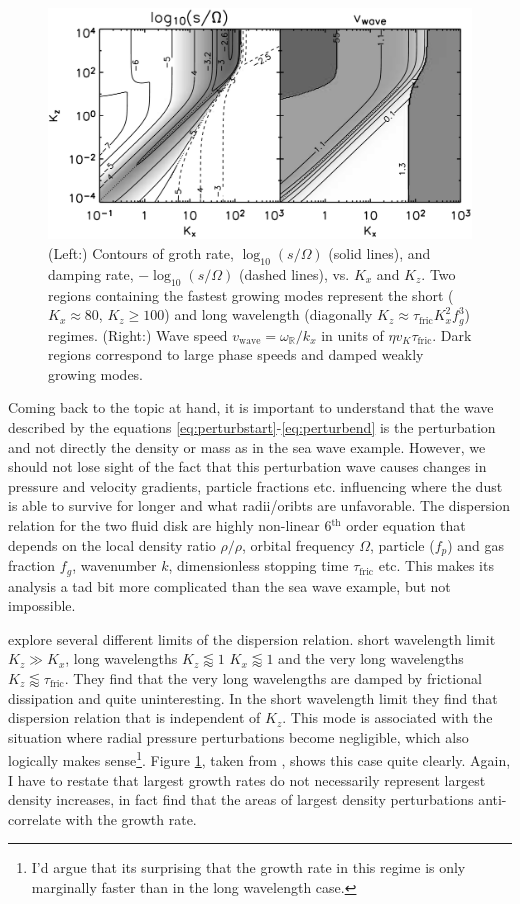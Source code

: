 \documentclass[12pt]{article}
\begin{document}
\begin{figure}[htbp]
    \label{fig:shortwave}
    \centering
    \includegraphics[width=0.7\linewidth]{images/shortwave.png}
    \caption{(Left:) Contours of groth rate, $\log_{10}(s/\Omega)$ (solid lines), and damping rate, $-\log_{10}(s/\Omega)$ (dashed lines), vs. $K_x$ and $K_z$. Two regions containing the fastest growing modes represent the short ($K_x\approx 80$, $K_z\ge100$) and long wavelength (diagonally $K_z\approx\tau_\mathrm{fric}K_x^2f_g^3$) regimes. (Right:) Wave speed $v_\mathrm{wave}=\omega_\mathbb{R}/k_x$ in units of $\eta v_K \tau_\mathrm{fric}$. Dark regions correspond to large phase speeds and damped weakly growing modes. }
\end{figure}

Coming back to the topic at hand, it is important to understand that the wave described by the equations \ref{eq:perturbstart}-\ref{eq:perturbend} is the perturbation and not directly the density or mass as in the sea wave example. However, we should not lose sight of the fact that this perturbation wave causes changes in pressure and velocity gradients, particle fractions etc. influencing where the dust is able to survive for longer and what radii/oribts are unfavorable. The dispersion relation for the two fluid disk are highly non-linear  6$^{\mathrm{th}}$ order equation that depends on the local density ratio $\rho/\rho$, orbital frequency $\Omega$, particle ($f_p$) and gas fraction $f_g$, wavenumber $k$, dimensionless stopping time $\tau_\mathrm{fric}$ etc. This makes its analysis a tad bit more complicated than the sea wave example, but not impossible. 

\cite{Youdin05} explore several different limits of the dispersion relation. short wavelength limit $K_z\gg K_x$, long wavelengths $K_z\lessapprox1$ $K_x\lessapprox1$ and the very long wavelengths $K_z\lessapprox\tau_\mathrm{fric}$. They find that the very long wavelengths are damped by frictional dissipation and quite uninteresting. In the short wavelength limit they find that dispersion relation that is independent of $K_z$. This mode is associated with the situation where radial pressure perturbations become negligible, which also logically makes sense\footnote{I'd argue that its surprising that the growth rate in this regime is only marginally faster than in the long wavelength case.}. Figure \ref{fig:shortwave}, taken from \cite{Youdin05}, shows this case quite clearly. Again, I have to restate that largest growth rates do not necessarily represent largest density increases, in fact \cite{Youdin05} find that the areas of largest density perturbations anti-correlate with the growth rate. 
\end{document}
